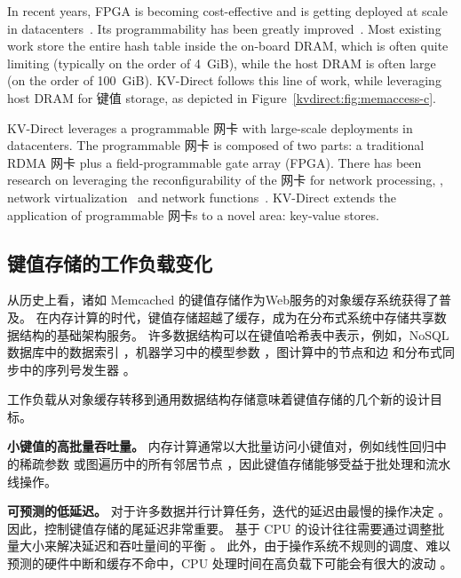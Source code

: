 {In recent years, FPGA is becoming cost-effective and is getting deployed at scale in datacenters~\cite{putnam2014programmable, caulfield2016cloud}. Its programmability has been greatly improved~\cite{li2016clicknp}.
Most existing work store the entire hash table inside the on-board DRAM, which is often quite limiting (typically on the order of 4~GiB), while the host DRAM is often large (on the order of 100~GiB).
KV-Direct follows this line of work, while leveraging host DRAM for 键值 storage, as depicted in Figure~\ref{kvdirect:fig:memaccess-c}.

KV-Direct leverages a programmable 网卡 with large-scale deployments in datacenters.
The programmable 网卡 is composed of two parts: a traditional RDMA 网卡 plus a field-programmable gate array (FPGA).
There has been research on leveraging the reconfigurability of the 网卡 for network processing, \eg, network virtualization~\cite{greenberg2015sdn, vfp} and network functions~\cite{li2016clicknp}.
KV-Direct extends the application of programmable 网卡s to a novel area: key-value stores.
}

\subsection{键值存储的工作负载变化}
\label{kvdirect:sec:workload-shift}

\iffalse
\textbf{讨论 serverless computing 中的 shared storage}
\fi

从历史上看，诸如 Memcached \cite {fitzpatrick2004distributed} 的键值存储作为Web服务的对象缓存系统获得了普及。
在内存计算的时代，键值存储超越了缓存，成为在分布式系统中存储共享数据结构的基础架构服务。
许多数据结构可以在键值哈希表中表示，例如，NoSQL 数据库中的数据索引 \cite {chang2008bigtable}，机器学习中的模型参数 \cite {li2014scaling}，图计算中的节点和边 \cite {shao2013trinity,xiao17tux2} 和分布式同步中的序列号发生器 \cite {kalia2016design,eris}。

工作负载从对象缓存转移到通用数据结构存储意味着键值存储的几个新的设计目标。

\textbf {小键值的高批量吞吐量。}
内存计算通常以大批量访问小键值对，例如线性回归中的稀疏参数 \cite {li2014algorithmic,xiao17tux2} 或图遍历中的所有邻居节点 \cite {shao2013trinity}，因此键值存储能够受益于批处理和流水线操作。

\textbf {可预测的低延迟。}
对于许多数据并行计算任务，迭代的延迟由最慢的操作决定 \cite {ousterhout2015ramcloud}。 因此，控制键值存储的尾延迟非常重要。
基于 CPU 的设计往往需要通过调整批量大小来解决延迟和吞吐量间的平衡 \cite {li2016full}。%
此外，由于操作系统不规则的调度、难以预测的硬件中断和缓存不命中，CPU 处理时间在高负载下可能会有很大的波动 \cite {li2016clicknp}。

